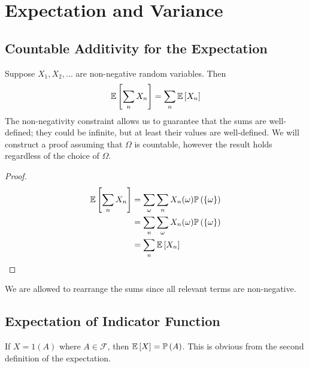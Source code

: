 \documentclass{article}
\begin{document}
\section{Expectation and Variance}
\subsection{Countable Additivity for the Expectation}
Suppose $X_1, X_2, \dots$ are non-negative random variables. Then
\[ \mathbb{E}\left[{\sum_n X_n}\right] = \sum_n \mathbb{E}\left[{X_n}\right] \]
The non-negativity constraint allows us to guarantee that the sums are well-defined; they could be infinite, but at least their values are well-defined. We will construct a proof assuming that $\Omega$ is countable, however the result holds regardless of the choice of $\Omega$.
\begin{proof}
    \begin{align*}
        \mathbb{E}\left[{\sum_n X_n}\right] & = \sum_\omega \sum_n X_n(\omega) \mathbb{P}\left({\{ \omega \}}\right) \\
                            & = \sum_n \sum_\omega X_n(\omega) \mathbb{P}\left({\{ \omega \}}\right) \\
                            & = \sum_n \mathbb{E}\left[{X_n}\right]
    \end{align*}
\end{proof}
\noindent We are allowed to rearrange the sums since all relevant terms are non-negative.

\subsection{Expectation of Indicator Function}
If $X = 1(A)$ where $A \in \mathcal F$, then $\mathbb{E}\left[{X}\right] = \mathbb{P}\left({A}\right)$. This is obvious from the second definition of the expectation.
\end{document}
